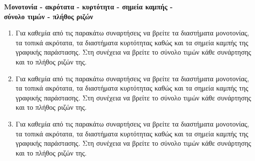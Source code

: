 \documentclass[11pt,a4paper]{article}
\begin{document}
\begin{center}
{\Large \textbf{Μονοτονία - ακρότατα - κυρτότητα - σημεία καμπής - \\σύνολο τιμών - πλήθος ριζών}}
\end{center}
\begin{enumerate}
\item Για καθεμία από τις παρακάτω συναρτήσεις να βρείτε τα διαστήματα μονοτονίας, τα τοπικά ακρότατα, τα διαστήματα κυρτότητας καθώς και τα σημεία καμπής της γραφικής παράστασης. Στη συνέχεια να βρείτε το σύνολο τιμών κάθε συνάρτησης και το πλήθος ριζών της.

\item Για καθεμία από τις παρακάτω συναρτήσεις να βρείτε τα διαστήματα μονοτονίας, τα τοπικά ακρότατα, τα διαστήματα κυρτότητας καθώς και τα σημεία καμπής της γραφικής παράστασης. Στη συνέχεια να βρείτε το σύνολο τιμών κάθε συνάρτησης και το πλήθος ριζών της.

\item Για καθεμία από τις παρακάτω συναρτήσεις να βρείτε τα διαστήματα μονοτονίας, τα τοπικά ακρότατα, τα διαστήματα κυρτότητας καθώς και τα σημεία καμπής της γραφικής παράστασης. Στη συνέχεια να βρείτε το σύνολο τιμών κάθε συνάρτησης και το πλήθος ριζών της.
\usepa
\end{enumerate}
\end{document}
